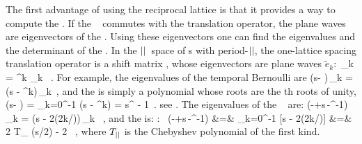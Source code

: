 The first advantage of using the reciprocal lattice is that it provides a
way to compute the {\HillDet}.
If the \jacobianOrb\  commutes with the translation
operator, the plane waves are eigenvectors of the \jacobianOrb. Using
these eigenvectors one can find the eigenvalues and the determinant of
the \jacobianOrb. In the ${||}$\dmn\ space of {\lattstate}s with
period-${||}$, the one-lattice spacing translation operator is a shift
matrix ,
whose eigenvectors are plane waves $\tilde{e}_k$:
\bea
\shift\,_k = \omega^{k} _k \, .
\eea
For example, the eigenvalues of the {temporal Bernoulli}
{\jacobianOrb}  are
\bea
({s}\id - {\shift})\,_k
= ({s} - \omega^{k})\,_k
\,,
\eea
and the {\HillDet} is simply a polynomial whose roots are the \cl{}th
roots of unity,
\bea
\Det({s}\id - {\shift})
=
\prod_{k=0}^{\cl{}-1} ({s} - \omega^{k})
=
s^{\cl{}} - 1
\,.
\eea
see .
The eigenvalues of the \templatt\
{\jacobianOrb}  are:
\bea
(-\shift+{s}\,\id-\shift^{-1})\,_k
=
({s} - 2\cos(2\pi k/\cl{}))\,_k \, ,
\eea
and the {\HillDet} is:
\bea
\mbox{\templatt: }\quad
\Det(-\shift+{s}\,\id-\shift^{-1})
    &=&
\prod_{k=0}^{\cl{}-1} [{s} - 2\cos(2\pi k/\cl{})]
    \continue
    &=&
2 T_{\cl{}} \left({s}/{2}\right) - 2 \, ,
\eea
where $T_{{||}}$ is the Chebyshev polynomial of the first
kind.

